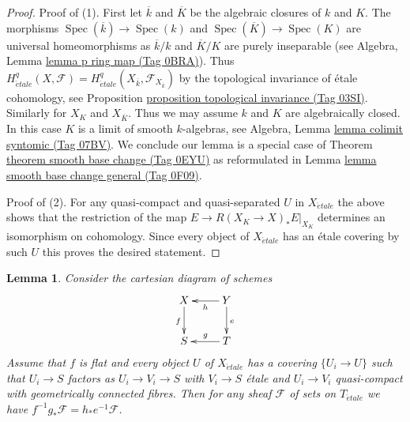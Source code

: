\documentclass{amsart}
\theoremstyle{plain}
\newtheorem{lemma}[subsection]{Lemma}
\theoremstyle{definition}
\theoremstyle{remark}
\numberwithin{equation}{subsection}
\def\Spec{\mathop{\mathrm{Spec}}}
\def\etale{{\acute{e}tale}}
\begin{document}
\begin{proof}
Proof of (1). First let $\overline{k}$ and $\overline{K}$
be the algebraic closures
of $k$ and $K$. The morphisms $\Spec(\overline{k}) \to \Spec(k)$ and
$\Spec(\overline{K}) \to \Spec(K)$ are universal homeomorphisms
as $\overline{k}/k$ and $\overline{K}/K$ are purely inseparable
(see Algebra, Lemma \href{https://stacks.math.columbia.edu/tag/0BRA}{lemma p ring map (Tag 0BRA)}).
Thus $H^q_\etale(X, \mathcal{F}) =
H^q_\etale(X_{\overline{k}}, \mathcal{F}_{X_{\overline{k}}})$ by
the topological invariance of \'etale cohomology, see
Proposition \href{https://stacks.math.columbia.edu/tag/03SI}{proposition topological invariance (Tag 03SI)}.
Similarly for $X_K$ and $X_{\overline{K}}$.
Thus we may assume $k$ and $K$ are algebraically closed.
In this case $K$ is a limit of smooth $k$-algebras, see
Algebra, Lemma \href{https://stacks.math.columbia.edu/tag/07BV}{lemma colimit syntomic (Tag 07BV)}.
We conclude our lemma is a special case of
Theorem \href{https://stacks.math.columbia.edu/tag/0EYU}{theorem smooth base change (Tag 0EYU)} as reformulated in
Lemma \href{https://stacks.math.columbia.edu/tag/0F09}{lemma smooth base change general (Tag 0F09)}.

\medskip\noindent
Proof of (2). For any quasi-compact and quasi-separated $U$ in $X_\etale$
the above shows that the restriction of the map
$E \to R(X_K \to X)_*E|_{X_K}$ determines an isomorphism on cohomology.
Since every object of $X_\etale$ has an \'etale covering by such $U$
this proves the desired statement.
\end{proof}


\begin{lemma}
\label{lemma-base-change-f-star-general}
Consider the cartesian diagram of schemes
$$
\xymatrix{
X \ar[d]_f & Y \ar[l]^h \ar[d]^e \\
S & T \ar[l]_g
}
$$
Assume that $f$ is flat and every object $U$ of $X_\etale$ has
a covering $\{U_i \to U\}$ such that $U_i \to S$
factors as $U_i \to V_i \to S$ with $V_i \to S$
\'etale and $U_i \to V_i$ quasi-compact with
geometrically connected fibres.
Then for any sheaf $\mathcal{F}$ of sets on $T_\etale$ we have
$f^{-1}g_*\mathcal{F} = h_*e^{-1}\mathcal{F}$.
\end{lemma}
\end{document}
